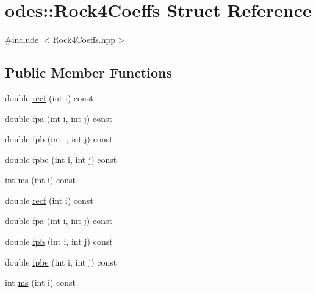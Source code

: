\hypertarget{structodes_1_1Rock4Coeffs}{\section{odes\-:\-:Rock4\-Coeffs Struct Reference}
\label{structodes_1_1Rock4Coeffs}
}


{\ttfamily \#include $<$Rock4\-Coeffs.\-hpp$>$}

\subsection*{Public Member Functions}
\begin{DoxyCompactItemize}
\item 
double \hyperlink{structodes_1_1Rock4Coeffs_a2a4eb9eefb93781048507fc28707a8ed}{recf} (int i) const 
\item 
double \hyperlink{structodes_1_1Rock4Coeffs_a0cb836cdb9aac957acc153cf6d8d3fca}{fpa} (int i, int j) const 
\item 
double \hyperlink{structodes_1_1Rock4Coeffs_aca4a34f7e73c1bdccc2b0b6a14a2400d}{fpb} (int i, int j) const 
\item 
double \hyperlink{structodes_1_1Rock4Coeffs_ad07b5e2d9db9494494f7b790fef062ec}{fpbe} (int i, int j) const 
\item 
int \hyperlink{structodes_1_1Rock4Coeffs_accac37d38507220ceb758c8dbd3ab21b}{ms} (int i) const 
\item 
double \hyperlink{structodes_1_1Rock4Coeffs_a2a4eb9eefb93781048507fc28707a8ed}{recf} (int i) const 
\item 
double \hyperlink{structodes_1_1Rock4Coeffs_a0cb836cdb9aac957acc153cf6d8d3fca}{fpa} (int i, int j) const 
\item 
double \hyperlink{structodes_1_1Rock4Coeffs_aca4a34f7e73c1bdccc2b0b6a14a2400d}{fpb} (int i, int j) const 
\item 
double \hyperlink{structodes_1_1Rock4Coeffs_ad07b5e2d9db9494494f7b790fef062ec}{fpbe} (int i, int j) const 
\item 
int \hyperlink{structodes_1_1Rock4Coeffs_accac37d38507220ceb758c8dbd3ab21b}{ms} (int i) const 
\end{DoxyCompactItemize}


